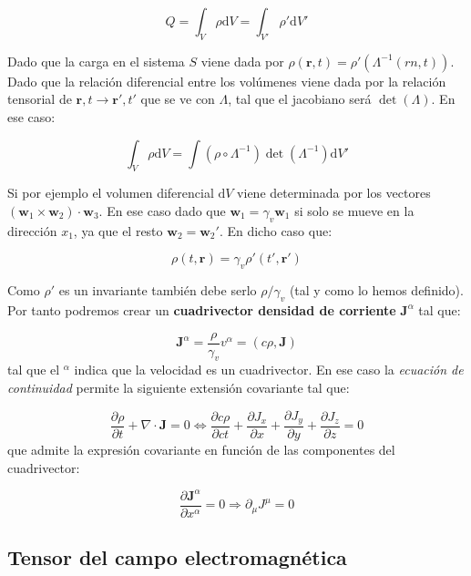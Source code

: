 \documentclass[12pt,a4paper]{article}
\newcommand{\parciales}[2]{\frac{\partial #1}{\partial #2}}
\newcommand{\D}{\mathrm{d}}
\newcommand{\dive}{\nabla \cdot}
\newcommand{\Jn}{\mathbf{J}}
\newcommand{\rn}{\mathbf{r}}
\newcommand{\wn}{\mathbf{w}}
\numberwithin{equation}{section}
\numberwithin{figure}{section}
\begin{document}
\begin{equation}
Q = \int_V \rho \D V = \int_{V'} \rho ' \D V'
\end{equation}

Dado que la carga en el sistema $S$ viene dada por $\rho (\rn,t) = \rho ' (\Lambda^{-1} (rn,t))$. Dado que la relación diferencial entre los volúmenes viene dada por la relación tensorial de $\rn,t \longrightarrow \rn',t'$ que se ve con $\Lambda$, tal que el jacobiano será $\det (\Lambda)$. En ese caso:

\begin{equation}
\int_V \rho \D V = \int  (\rho \circ \Lambda^{-1})  \det (\Lambda^{-1})  \D V'
\end{equation}

Si por ejemplo el volumen diferencial $\D V$ viene determinada por los vectores $(\wn_1 \times \wn_2) \cdot \wn_3$. En ese caso dado que $\wn_1 = \gamma_v \wn_1$ si solo se mueve en la dirección $x_1$, ya que el resto $\wn_2 = \wn_2'$. En dicho caso que:


\begin{equation}
\rho (t,\rn) = \gamma_v \rho' (t',\rn')
\end{equation}


Como $\rho'$ es un invariante también debe serlo $\rho/\gamma_v$ (tal y como lo hemos definido). Por tanto podremos crear un \textbf{cuadrivector densidad de corriente} $\Jn^\alpha$ tal que:

\begin{equation}
\Jn^\alpha = \dfrac{\rho}{\gamma_v} v^\alpha   = (c \rho , \Jn)
\end{equation}
tal que el $^\alpha$ indica que la velocidad es un cuadrivector. En ese caso la \textit{ecuación de continuidad} permite la siguiente extensión covariante tal que:

\begin{equation}
\parciales{\rho}{t} + \dive \Jn = 0 \Longleftrightarrow \parciales{c \rho}{c t} +  \parciales{J_x}{x}  +  \parciales{J_y}{y}  +  \parciales{J_z}{z} = 0
\end{equation}
que admite la expresión covariante en función de las componentes del cuadrivector:

\begin{equation}
\parciales{\Jn^{\alpha}}{x^{\alpha}} = 0 \Longrightarrow \partial_\mu J^\mu = 0
\end{equation}

\subsection{Tensor del campo electromagnética}
\end{document}
